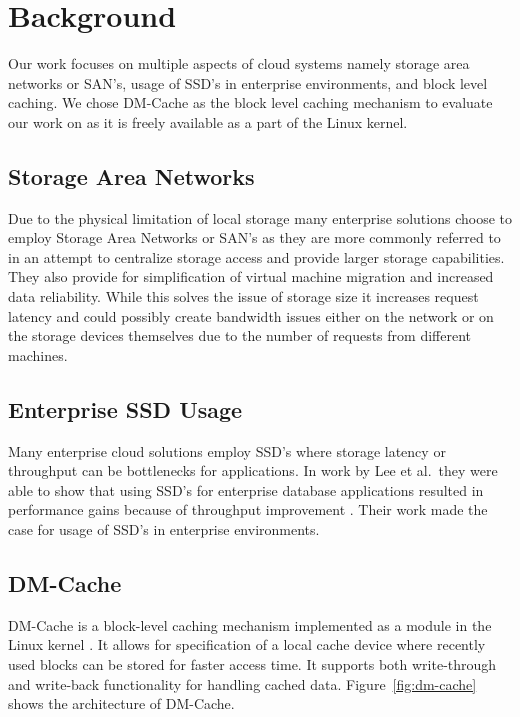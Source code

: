 \section{Background}

Our work focuses on multiple aspects of cloud systems namely storage
area networks or SAN's, usage of SSD's in enterprise environments, and
block level caching. We chose DM-Cache as the block level caching
mechanism to evaluate our work on as it is freely available as a part
of the Linux kernel.

\subsection{Storage Area Networks}

Due to the physical limitation of local storage many enterprise
solutions choose to employ Storage Area Networks or SAN's as they are
more commonly referred to in an attempt to centralize storage access
and provide larger storage capabilities. They also provide for
simplification of virtual machine migration and increased data
reliability. While this solves the issue of storage size it increases
request latency and could possibly create bandwidth issues either on
the network or on the storage devices themselves due to the number of
requests from different machines.

\subsection{Enterprise SSD Usage}

Many enterprise cloud solutions employ SSD's where storage latency or
throughput can be bottlenecks for applications. In work by Lee et al.\
they were able to show that using SSD's for enterprise database
applications resulted in performance gains because of throughput
improvement \cite{EnterpriseSSD}. Their work made the case for usage
of SSD's in enterprise environments.


\subsection{DM-Cache}

DM-Cache is a block-level caching mechanism implemented as a module in
the Linux kernel \cite{DM-Cache}. It allows for specification of a
local cache device where recently used blocks can be stored for faster
access time. It supports both write-through and write-back
functionality for handling cached data. Figure~\ref{fig:dm-cache}
shows the architecture of DM-Cache.

